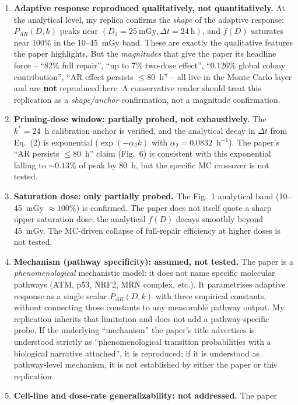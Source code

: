 \documentclass[11pt]{article}
\begin{document}
\begin{enumerate}
    \item \textbf{Adaptive response reproduced qualitatively, not quantitatively.} At the
    analytical level, my replica confirms the \emph{shape} of the adaptive response:
    $P_{AR}(D,k)$ peaks near $(D_1=25~\text{mGy}, \Delta t=24~\text{h})$, and $f(D)$
    saturates near 100\% in the 10--45~mGy band. These are exactly the qualitative
    features the paper highlights. But the \emph{magnitudes} that give the paper its
    headline force -- ``82\% full repair'', ``up to 7\% two-dose effect'', ``0.126\%
    global colony contribution'', ``AR effect persists $\le 80$~h'' -- all live in the
    Monte Carlo layer and are \textbf{not} reproduced here. A conservative reader should
    treat this replication as a \emph{shape/anchor} confirmation, not a magnitude
    confirmation.
    \item \textbf{Priming-dose window: partially probed, not exhaustively.} The
    $k^{*}=24$~h calibration anchor is verified, and the analytical decay in $\Delta t$
    from Eq.~(2) is exponential ($\exp(-\alpha_2 k)$ with $\alpha_2=0.0832$~h$^{-1}$).
    The paper's ``AR persists $\le 80$~h'' claim (Fig.~6) is consistent with this
    exponential falling to $\sim 0.13\%$ of peak by 80~h, but the specific MC crossover
    is not tested.
    \item \textbf{Saturation dose: only partially probed.} The Fig.~1 analytical band
    (10--45~mGy $\approx 100\%$) is confirmed. The paper does not itself quote a sharp
    upper saturation dose; the analytical $f(D)$ decays smoothly beyond 45~mGy. The
    MC-driven collapse of full-repair efficiency at higher doses is not tested.
    \item \textbf{Mechanism (pathway specificity): assumed, not tested.} The paper is a
    \emph{phenomenological} mechanistic model: it does not name specific molecular
    pathways (ATM, p53, NRF2, MRN complex, etc.). It parametrises adaptive response as
    a single scalar $P_{AR}(D,k)$ with three empirical constants, without connecting
    those constants to any measurable pathway output. My replication inherits that
    limitation and does not add a pathway-specific probe. If the underlying
    ``mechanism'' the paper's title advertises is understood strictly as
    ``phenomenological transition probabilities with a biological narrative attached'',
    it is reproduced; if it is understood as pathway-level mechanism, it is not
    established by either the paper or this replication.
    \item \textbf{Cell-line and dose-rate generalizability: not addressed.} The paper

\end{enumerate}
\end{document}
